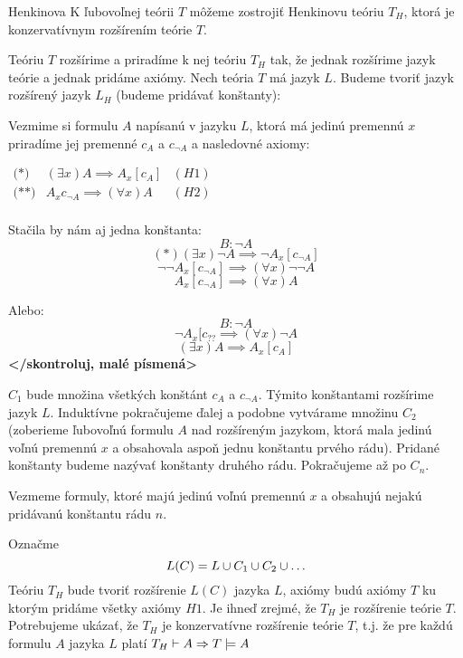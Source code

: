 \begin{veta}{Henkinova} 
    K ľubovoľnej teórii $T$ môžeme zostrojiť Henkinovu
    teóriu $T_H$, ktorá je konzervatívnym rozšírením teórie $T$.
\end{veta}    

\begin{dokaz}
    Teóriu $T$ rozšírime a priradíme k nej teóriu $T_H$ tak, že
    jednak rozšírime jazyk teórie a jednak pridáme axiómy.
    Nech teória $T$ má jazyk $L$.
    Budeme tvoriť jazyk rozšírený jazyk $L_H$ (budeme pridávať konštanty):


    \par Vezmime si formulu $A$ napísanú v jazyku $L$, ktorá má jedinú premennú $x$
    priradíme jej premenné $c_A$ a $c_{\neg A}$ a nasledovné axiomy: 

    $
    \begin{array}{lll}
    \mbox{(*)} & (\exists x) A \implies A_x[c_A] & (H1) \\
    \mbox{(**)} & A_x{c_{\neg A}} \implies (\forall x) A & (H2) \\
    \end{array}
    $

    Stačila by nám aj jedna konštanta:
    $$B: \neg A$$
    $$ (*) (\exists x) \neg A \implies \neg A_x[c_{\neg A}]$$
    $$\neg \neg A_x[c_{\neg A}] \implies (\forall x) \neg \neg A$$
    $$A_x[c_{\neg A}] \implies (\forall x) A$$

    Alebo:
    $$B: \neg A$$
    $$\neg A_x[c_{??} \implies (\forall x) \neg A$$
    $$(\exists x) A \implies A_x[c_A]$$
    \textbf{</skontroluj, malé písmená>}

    \par $C_1$ bude množina všetkých konštánt $c_A$ a $c_{\neg A}$. Týmito konštantami
    rozšírime jazyk $L$. Induktívne pokračujeme ďalej a podobne vytvárame množinu $C_2$
    (zoberieme ľubovoľnú formulu $A$ nad rozšíreným jazykom, ktorá mala jedinú voľnú
    premennú $x$ a obsahovala aspoň jednu konštantu prvého rádu).
    Pridané konštanty budeme nazývať konštanty druhého rádu. Pokračujeme až po
    $C_n$.

    \par Vezmeme formuly, ktoré majú jedinú voľnú premennú $x$ a obsahujú nejakú
    pridávanú konštantu rádu $n$.

    Označme
    \begin{equation*}
        L(C) = L \cup C_1 \cup C_2 \cup \ldots
    \end{equation*}
    Teóriu $T_H$ bude tvoriť rozšírenie $L(C)$ jazyka $L$, axiómy budú axiómy $T$
    ku ktorým pridáme všetky axiómy $H1$.
    Je ihneď zrejmé, že $T_H$ je rozšírenie teórie $T$.
    Potrebujeme ukázať, že $T_H$ je konzervatívne rozšírenie teórie $T$, t.j.
    že pre každú formulu $A$ jazyka $L$ platí 
    $T_H \vdash A \Rightarrow T \models A$


\end{dokaz}
